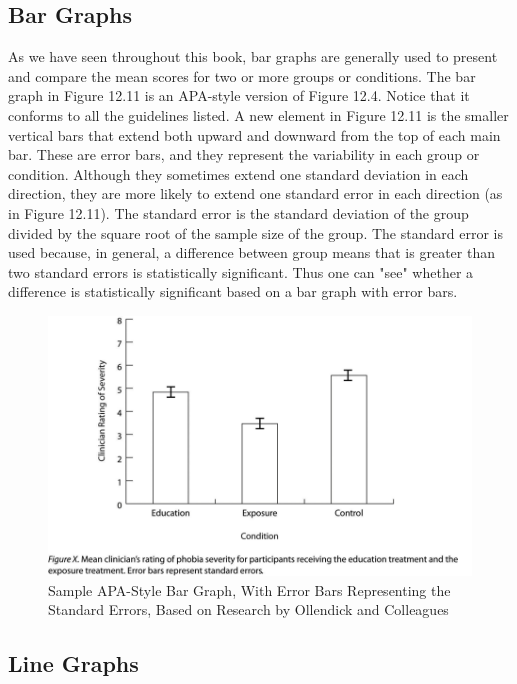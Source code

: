 \subsection{Bar Graphs}

As we have seen throughout this book, bar graphs are generally used to present and compare the mean scores for two or more groups or conditions. The bar graph in Figure 12.11 is an APA-style version of Figure 12.4. Notice that it conforms to all the guidelines listed. A new element in Figure 12.11 is the smaller vertical bars that extend both upward and downward from the top of each main bar. These are error bars, and they represent the variability in each group or condition. Although they sometimes extend one standard deviation in each direction, they are more likely to extend one standard error in each direction (as in Figure 12.11). The standard error is the standard deviation of the group divided by the square root of the sample size of the group. The standard error is used because, in general, a difference between group means that is greater than two standard errors is statistically significant. Thus one can "see" whether a difference is statistically significant based on a bar graph with error bars.

\begin{figure}
\includegraphics[width=\linewidth]{figures/Fig12-11}
\caption{Sample APA-Style Bar Graph, With Error Bars Representing the Standard Errors, Based on Research by Ollendick and Colleagues}
\label{fig:barwitherror}
\end{figure}


\subsection{Line Graphs}

